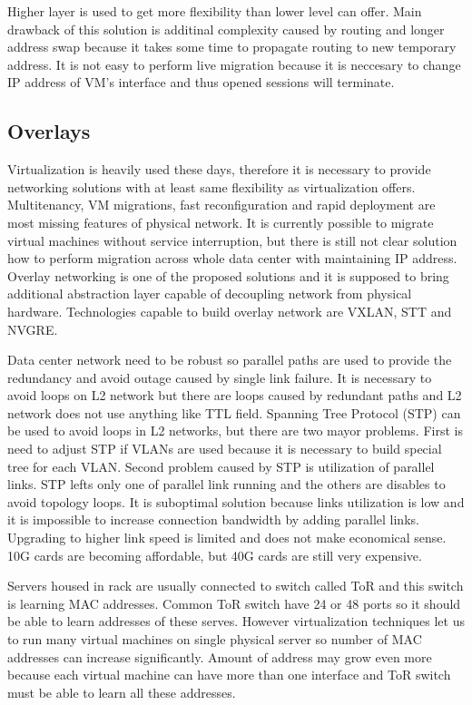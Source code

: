 Higher layer is used to get more flexibility than lower level can offer. Main drawback of this solution is additinal complexity caused by routing and longer address swap because it takes some time to propagate routing to new temporary address. It is not easy to perform live migration because it is neccesary to change \Ac{IP} address of \Ac{VM}'s interface and thus opened sessions will terminate.

\subsection{Overlays}
\label{par:overlays}
Virtualization is heavily used these days, therefore it is necessary to provide networking solutions with at least same flexibility as virtualization offers. Multitenancy, \Ac{VM} migrations, fast reconfiguration and rapid deployment are most missing features of physical network. It is currently possible to migrate virtual machines without service interruption, but there is still not clear solution how to perform migration across whole data center with maintaining \Ac{IP} address. Overlay networking is one of the proposed solutions and it is supposed to bring additional abstraction layer capable of decoupling network from physical hardware. 
Technologies capable to build overlay network are \Ac{VXLAN}, \Ac{STT} and \Ac{NVGRE}. 

Data center network need to be robust so parallel paths are used to provide the redundancy and avoid outage caused by single link failure. It is necessary to avoid loops on L2 network but there are loops caused by redundant paths and L2 network does not use anything like \Ac{TTL} field.  Spanning Tree Protocol (\Ac{STP}) can be used to avoid loops in L2 networks, but there are two mayor problems. First is need to adjust \Ac{STP} if \Ac{VLAN}s are used because it is necessary to build special tree for each \Ac{VLAN}. Second problem caused by \Ac{STP} is utilization of parallel links. \Ac{STP} lefts only one of parallel link running and the others are disables to avoid topology loops. It is suboptimal solution because links utilization is low and it is impossible to increase connection bandwidth by adding parallel links. Upgrading to higher link speed is limited and does not make economical sense. 10G cards are becoming affordable, but 40G cards are still very expensive.

Servers housed in rack are usually connected to switch called \Ac{ToR} and this switch is learning \Ac{MAC} addresses. Common \Ac{ToR} switch have 24 or 48 ports so it should be able to learn addresses of these serves. However virtualization techniques let us to run many virtual machines on single physical server so number of \Ac{MAC} addresses can increase significantly. Amount of address may grow even more because each virtual machine can have more than one interface and \Ac{ToR} switch must be able to learn all these addresses.


